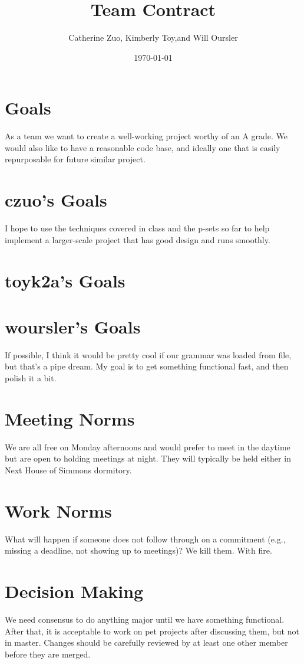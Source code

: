 

\author{ Catherine Zuo, Kimberly Toy,and Will Oursler} 
\address{ MIT, Cambridge, MA }
\title{Team Contract}
\date{\today}
\maketitle

\section{ Goals }
As a team we want to create a well-working project worthy of an A grade. We would also like to have a reasonable code base, and ideally one that is easily repurposable for future similar project.

\section{ czuo's Goals }
I hope to use the techniques covered in class and the p-sets so far to help implement a larger-scale project that has good design and runs smoothly.  
\section{ toyk2a's Goals }
\section{ woursler's Goals }
If possible, I think it would be pretty cool if our grammar was loaded from file, but that's a pipe dream. My goal is to get something functional fast, and then polish it a bit.

\section{Meeting Norms}
We are all free on Monday afternoons and would prefer to meet in the daytime but are open to holding meetings at night.  They will typically be held either in Next House of Simmons dormitory.  

\section{Work Norms}

What will happen if someone does not follow through on a commitment (e.g., missing a deadline, not showing up to meetings)? We kill them. With fire.

\section{Decision Making}

We need consensus to do anything major until we have something functional. After that, it is acceptable to work on pet projects after discussing them, but not in master. Changes should be carefully reviewed by at least one other member before they are merged.


